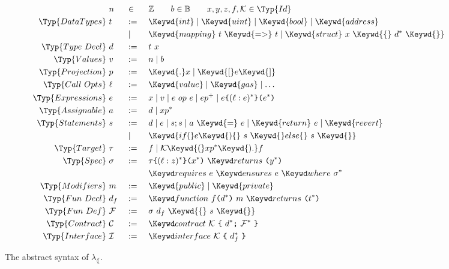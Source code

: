 \begin{figure}
  \begin{alignat*}{3}
    &~ n && \in && \mathbb{Z} \qquad b \in \mathbb{B} \qquad x,y,z,f,\K \in \Typ{Id}   \\
    \Typ{Data Types}  &~ t && :=\ && \Keywd{int} \mid \Keywd{uint} \mid \Keywd{bool} \mid \Keywd{address} \\
                      &~   && \mid\ && \Keywd{mapping} ~t~ \Keywd{=>} ~t \mid \Keywd{struct} ~x~ \Keywd{\{}~ d^* ~\Keywd{\}} \\
    \Typ{Type~Decl}   &~ d && :=\ && t ~ x \\
    \Typ{Values}      &~ v && :=\ && n \mid b \\
    \Typ{Projection}  &~ p && :=\ && \Keywd{.}x \mid \Keywd{[}e\Keywd{]} \\
    \Typ{Call~Opts}   &~ \ell&& :=\ && \Keywd{value} \mid \Keywd{gas} \mid \dots \\
    \Typ{Expressions} &~ e && :=\ && x \mid v \mid e ~op~ e \mid e p^+ \mid \AddrCall{e}{(\ell: e)^*}{e^*} \\
    \Typ{Assignable}  &~ a && :=\ && d \mid x p^* \\ %
    \Typ{Statements}  &~ s && :=\ && d \mid e \mid s; s \mid a ~\Keywd{=}~ e \mid \Keywd{return}~ e \mid \Keywd{revert} \\
                      &~   && \mid\ && \Keywd{if (}e\Keywd{) \{}~ s ~\Keywd{\} else \{}~ s ~\Keywd{\}} \\
    \Typ{Target}      &~ \tau && :=\ && f \mid \K \Keywd{(} x p^* \Keywd{).}f \\
    \Typ{Spec}        &~ \sigma && :=\ && \SpecCall{\tau}{(\ell : z)^*}{x^*}{y^*} \\
                      &~        &&     && \SpecCond{e}{e}{\sigma^*} \\
    \Typ{Modifiers}   &~ m && :=\ && \Keywd{public} \mid \Keywd{private} \\
    \Typ{Fun~Decl}    &~ d_f && :=\ && \FunType{f}{d^*}{m}{t^*} \\
    \Typ{Fun~Def}     &~ \F&& :=\ && \sigma ~ d_f ~ \Keywd{\{} ~ s ~ \Keywd{\}} \\
    \Typ{Contract}    &~ \C&& :=\ && \Contract{\K}{d^*}{\F^*} \\
    \Typ{Interface}   &~ \I&& :=\ && \Interface{\K}{d_f^*}
  \end{alignat*}
  \caption{The abstract syntax of $\lambda_\lang$.}
  \label{fig:syntax}
\end{figure}

